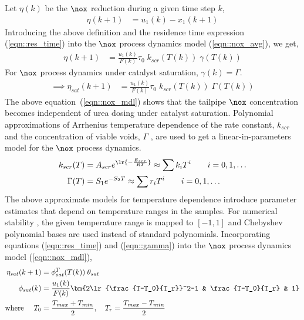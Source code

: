 Let $\eta(k)$ be the $\nox$ reduction during a given time step $k$,
\begin{align}
    \eta (k+1) &= u_1(k) - x_1(k+1)
\end{align}
Introducing the above definition and the residence time expression (\ref{eqn::res_time}) into the $\nox$ process dynamics model (\ref{eqn::nox_avg}), we get,
\begin{align}
    \eta (k+1) &=   \frac{u_1(k)}{F(k)} \tau_0 \; k_{scr}(T(k)) \; \gamma (T(k)) \label{eqn::flow_scaled_nox_eff}
\end{align}
For $\nox$ process dynamics under catalyst saturation, $\gamma(k) = \Gamma$.
\begin{align}
    \implies \eta_{sat} (k+1) &=  \frac{u_1(k)}{F(k)} \tau_0 \; k_{scr}(T(k)) \; \Gamma (T(k))
        \label{eqn::nox_mdl}
\end{align}
The above equation~(\ref{eqn::nox_mdl}) shows that the tailpipe $\nox$ concentration becomes independent of urea dosing under catalyst saturation. Polynomial approximations of Arrhenius temperature dependence of the rate constant, $k_{scr}$ and the concentration of viable voids, $\Gamma$ \citep{nova2014urea,ciardelli2004scr,joo2008study}, are used to get a linear-in-parameters model for the $\nox$ process dynamics.
\begin{align}
    k_{scr}(T) &= A_{scr} e^{\lr{-\frac{E_{scr}}{RT}}} \approx \sum k_i T^i  \qquad i = 0, 1, \hdots
    \label{eqn::rate_const} \\
    \Gamma(T) &= S_1 e^{-S_2 T} \approx \sum r_i T^i \qquad i = 0, 1, \hdots
    \label{eqn::gamma}
\end{align}
The above approximate models for temperature dependence introduce parameter estimates that depend on temperature ranges
in the samples. For numerical stability \citep{press2003numerical}, the given temperature range is mapped to $[-1,1]$ and
Chebyshev polynomial bases \citep{trefethen2019approximation} are used instead of standard polynomials. Incorporating
equations (\ref{eqn::res_time}) and (\ref{eqn::gamma}) into the $\nox$ process dynamics model (\ref{eqn::nox_mdl}),
\begin{align}
    \eta_{sat} (k+1) &= \phi_{sat}^T(T(k)) \; \theta_{sat}
    \label{eqn::regression} \\
    \phi_{sat} (k) &= \frac{u_1(k)}{F(k)} \bm{2\lr{\frac{T-T_0}{T_r}}^2-1 & \frac{T-T_0}{T_r} & 1}
    \label{eqn::phi_def} \\
    \text{where } \quad T_0 &= \frac{T_{max} + T_{min}}{2}, \quad T_r = \frac{T_{max} - T_{min}}{2} \notag
\end{align}
